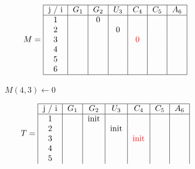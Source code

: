 \begin{figure}[H]
    \centering
    \begin{subfigure}[t]{0.25\textwidth}
        \scriptsize \[
                        M =  \begin{tabular}{|c|c|c|c|c|c|c|}
                                 \hline
                                 j / i & $G_1$ & $G_2$ & $U_3$ & $C_4$              & $C_5$ & $A_6$ \\ \hline
                                 1     &       & 0     &       &                    &       &       \\
                                 2     &       &       & 0     &                    &       &       \\
                                 3     &       &       &       & \textcolor{red}{0} &       &       \\
                                 4     &       &       &       &                    &       &       \\
                                 5     &       &       &       &                    &       &       \\
                                 6     &       &       &       &                    &       &       \\ \hline
                        \end{tabular}
        \]
        \caption{$M(4,3) \gets 0$}
    \end{subfigure}
    \hfill
    \begin{subfigure}[t]{0.65\textwidth}
        \scriptsize \[
                        T =     \begin{tabular}{|c|c|c|c|c|c|c|}
                                    \hline
                                    j / i & $G_1$ & $G_2$ & $U_3$ & $C_4$                 & $C_5$ & $A_6$ \\ \hline
                                    1     &       & init  &       &                       &       &       \\
                                    2     &       &       & init  &                       &       &       \\
                                    3     &       &       &       & \textcolor{red}{init} &       &       \\
                                    4     &       &       &       &                       &       &       \\
                                    5     &       &       &       &                       &       &       \\

\end{tabular}\]
\end{subfigure}
\end{figure}
